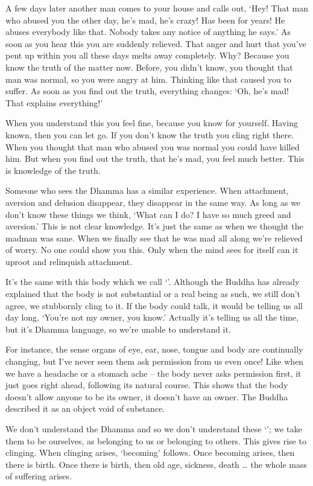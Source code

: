 A few days later another man comes to your house and calls out, `Hey! That man who abused you the other day, he's mad, he's crazy! Has been for years! He abuses everybody like that. Nobody takes any notice of anything he says.' As soon as you hear this you are suddenly relieved. That anger and hurt that you've pent up within you all these days melts away completely. Why? Because you know the truth of the matter now. Before, you didn't know, you thought that man was normal, so you were angry at him. Thinking like that caused you to suffer. As soon as you find out the truth, everything changes: `Oh, he's mad! That explains everything!'

When you understand this you feel fine, because you know for yourself. Having known, then you can let go. If you don't know the truth you cling right there. When you thought that man who abused you was normal you could have killed him. But when you find out the truth, that he's mad, you feel much better. This is knowledge of the truth.

Someone who sees the Dhamma has a similar experience. When attachment, aversion and delusion disappear, they disappear in the same way. As long as we don't know these things we think, `What can I do? I have so much greed and aversion.' This is not clear knowledge. It's just the same as when we thought the madman was sane. When we finally see that he was mad all along we're relieved of worry. No one could show you this. Only when the mind sees for itself can it uproot and relinquish attachment.

It's the same with this body which we call `'. Although the Buddha has already explained that the body is not substantial or a real being as such, we still don't agree, we stubbornly cling to it. If the body could talk, it would be telling us all day long, `You're not my owner, you know.' Actually it's telling us all the time, but it's Dhamma language, so we're unable to understand it.

For instance, the sense organs of eye, ear, nose, tongue and body are continually changing, but I've never seen them ask permission from us even once! Like when we have a headache or a stomach ache -- the body never asks permission first, it just goes right ahead, following its natural course. This shows that the body doesn't allow anyone to be its owner, it doesn't have an owner. The Buddha described it as an object void of substance.

We don't understand the Dhamma and so we don't understand these `'; we take them to be ourselves, as belonging to us or belonging to others. This gives rise to clinging. When clinging arises, `becoming' follows. Once becoming arises, then there is birth. Once there is birth, then old age, sickness, death \ldots{} the whole mass of suffering arises.

